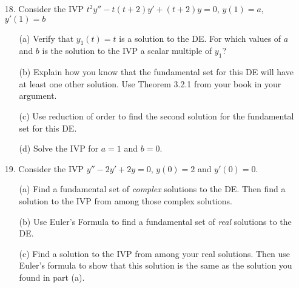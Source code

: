\documentclass[12pt]{article}
\begin{document}
\begin{itemize}
\item[18.] Consider the IVP $t^2y'' - t(t+2)y' + (t+2)y = 0$, $y(1)=a$, $y'(1)=b$
\begin{itemize}
\item[(a)] Verify that $y_1(t) = t$ is a solution to the DE.  For which values of $a$ and $b$ is the solution to the IVP a scalar multiple of $y_1$?
\item[(b)] Explain how you know that the fundamental set for this DE will have at least one other solution.  Use Theorem 3.2.1 from your book in your argument.
\item[(c)] Use reduction of order to find the second solution for the fundamental set for this DE.
\item[(d)] Solve the IVP for $a = 1$ and $b=0$.
\end{itemize}



\item[19.] Consider the IVP $y''-2y'+2y = 0$, $y(0) = 2$ and $y'(0) = 0$.  
\begin{itemize}
\item[(a)] Find a fundamental set of \textit{complex} solutions to the DE.  Then find a solution to the IVP from among those complex solutions.
\item[(b)] Use Euler's Formula to find a fundamental set of \textit{real} solutions to the DE.
\item[(c)] Find a solution to the IVP from among your real solutions.  Then use Euler's formula to show that this solution is the same as the solution you found in part (a).
\end{itemize}



\end{itemize}


\end{document}
